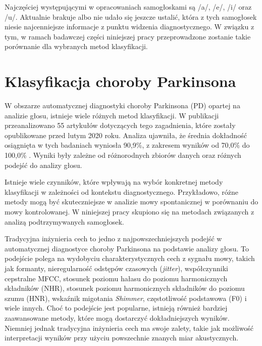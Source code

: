 Najczęściej występującymi w opracowaniach samogłoskami są /a/, /e/, /i/ oraz /u/.
Aktualnie brakuje albo nie udało się jeszcze ustalić, która z tych samogłosek niesie najcenniejsze informacje z punktu widzenia diagnostycznego.
W związku z tym, w ramach badawczej części niniejszej pracy przeprowadzone zostanie takie porównanie dla wybranych metod klasyfikacji.

\section{Klasyfikacja choroby Parkinsona}\label{sec:metody-klasyfikacji}

W obszarze automatycznej diagnostyki choroby Parkinsona (PD) opartej na analizie głosu, istnieje wiele różnych metod klasyfikacji.
W publikacji~\cite{ML_for_PD_review} przeanalizowano 55 artykułów dotyczących tego zagadnienia, które zostały opublikowane przed lutym 2020 roku.
Analiza ujawniła, że średnia dokładność osiągnięta w tych badaniach wyniosła 90,9\%, z zakresem wyników od 70,0\%
\cite{7378178, multimodel-framework} do 100,0\% \cite{new-hybrid, fuzzy-neural-system, linear-discriminant-analysis, dastjerd}.
Wyniki były zależne od różnorodnych zbiorów danych oraz różnych podejść do analizy głosu.

Istnieje wiele czynników, które wpływają na wybór konkretnej metody klasyfikacji w zależności od kontekstu diagnostycznego.
Przykładowo, różne metody mogą być skuteczniejsze w analizie mowy spontanicznej w porównaniu do mowy kontrolowanej.
W niniejszej pracy skupiono się na metodach związanych z analizą podtrzymywanych samogłosek.

Tradycyjna inżynieria cech to jedno z najpowszechniejszych podejść w automatycznej diagnostyce choroby Parkinsona na podstawie analizy głosu.
To podejście polega na wydobyciu charakterystycznych cech z sygnału mowy, takich jak formanty, nieregularność odstępów czasowych (\emph{jitter}),
współczynniki cepstralne MFCC, stosunek poziomu hałasu do poziomu harmonicznych składników (NHR), stosunek poziomu harmonicznych składników
do poziomu szumu (HNR), wskaźnik migotania \emph{Shimmer}, częstotliwość podstawowa (F0) i wiele innych.
Choć to podejście jest popularne, istnieją również bardziej zaawansowane metody, które mogą dostarczyć dokładniejszych wyników.
Niemniej jednak tradycyjna inżynieria cech ma swoje zalety, takie jak możliwość interpretacji wyników przy użyciu powszechnie znanych miar akustycznych.

